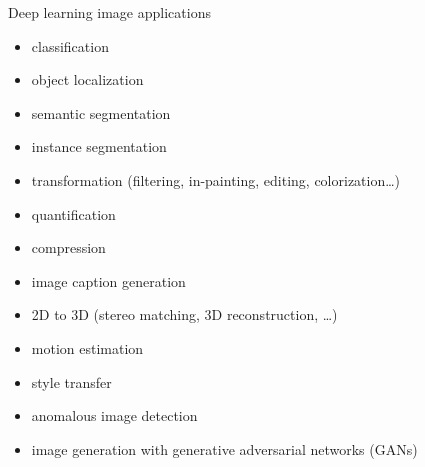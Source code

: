 \documentclass[xcolor=pdftex,dvipsnames,table,mathserif]{beamer}
\begin{document}


\begin{frame}{Deep learning image applications}

  \begin{itemize}
  \item classification
  \item object localization
  \item semantic segmentation
  \item instance segmentation
  \item transformation (filtering, in-painting, editing, colorization…)
  \item quantification
  \item compression
  \item image caption generation
  \item 2D to 3D (stereo matching, 3D reconstruction, …)
  \item motion estimation
  \item style transfer
  \item anomalous image detection
  \item image generation with generative adversarial networks (GANs)
  \end{itemize}


\end{frame}



\end{document}
